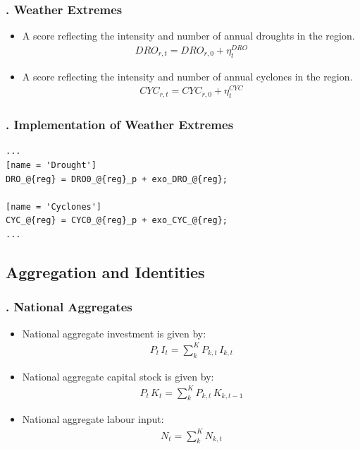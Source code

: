 \documentclass[11pt,aspectratio=169]{beamer}
\begin{document}
\begin{frame}
\frametitle{{\thesection.\thesubsection} Weather Extremes}
\scriptsize
\begin{itemize}
\item A score reflecting the intensity and number of annual droughts in the region.
\begin{align*}
DRO_{r,t} = DRO_{r,0} + \eta^{DRO}_{t}
\end{align*}
\item A score reflecting the intensity and number of annual cyclones in the region.
\begin{align*}
CYC_{r,t} = CYC_{r,0} + \eta^{CYC}_{t}
\end{align*}
\end{itemize}
\end{frame}

\begin{frame}[fragile]
\frametitle{{\thesection.\thesubsection} Implementation of Weather Extremes}

\begin{lstlisting}[frame = single]
...
[name = 'Drought']
DRO_@{reg} = DRO0_@{reg}_p + exo_DRO_@{reg};

[name = 'Cyclones']
CYC_@{reg} = CYC0_@{reg}_p + exo_CYC_@{reg};
...
\end{lstlisting}
\end{frame}

\subsection{Aggregation and Identities}

\begin{frame}
\frametitle{{\thesection.\thesubsection} National Aggregates}
\scriptsize
\begin{itemize}
\item National aggregate investment is given by:
\begin{align*}
P_{t} \, I_{t} = \sum_{k}^{K} P_{k,t} \, I_{k,t}
\end{align*}
\item National aggregate capital stock is given by:
\begin{align*}
P_{t} \, K_{t} = \sum_{k}^{K} P_{k,t} \, K_{k,t-1}
\end{align*}
\item National aggregate labour input:
\begin{align*}
N_{t} = \sum_{k}^{K} N_{k,t}
\end{align*}

\end{itemize}
\end{frame}
\end{document}
